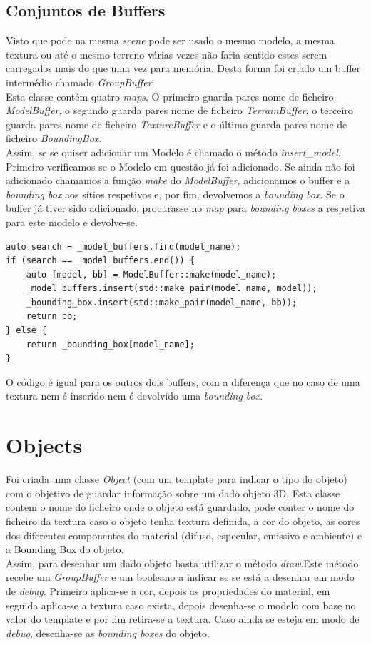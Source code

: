 \documentclass[a4paper]{report}
\begin{document}
\subsection{Conjuntos de Buffers}
Visto que pode na mesma \textit{scene} pode ser usado o mesmo modelo, a mesma
textura ou até o mesmo terreno várias vezes não faria sentido estes serem
carregados mais do que uma vez para memória. Desta forma foi criado um buffer
intermédio chamado \textit{GroupBuffer}.\\
Esta classe contém quatro \textit{maps}. O primeiro guarda pares nome de
ficheiro \textit{ModelBuffer}, o segundo guarda pares nome de ficheiro
\textit{TerrainBuffer}, o terceiro guarda pares nome de ficheiro
\textit{TextureBuffer} e o último guarda pares nome de ficheiro
\textit{BoundingBox}.\\
Assim, se se quiser adicionar um Modelo é chamado o método
\textit{insert\_model}. Primeiro verificamos se o Modelo em questão já foi
adicionado. Se ainda não foi adicionado chamamos a função \textit{make} do
\textit{ModelBuffer}, adicionamos o buffer e a \textit{bounding box} aos sítios
respetivos e, por fim, devolvemos a \textit{bounding box}. Se o buffer já tiver
sido adicionado, procurasse no \textit{map} para \textit{bounding boxes} a
respetiva para este modelo e devolve-se.
\begin{lstlisting}
auto search = _model_buffers.find(model_name);
if (search == _model_buffers.end()) {
    auto [model, bb] = ModelBuffer::make(model_name);
    _model_buffers.insert(std::make_pair(model_name, model));
    _bounding_box.insert(std::make_pair(model_name, bb));
    return bb;
} else {
    return _bounding_box[model_name];
}
\end{lstlisting}
O código é igual para os outros dois buffers, com a diferença que no caso de uma
textura nem é inserido nem é devolvido uma \textit{bounding box}.

\section{Objects}
Foi criada uma classe \textit{Object} (com um template para indicar o tipo do
objeto) com o objetivo de guardar informação sobre um dado objeto 3D. Esta
classe contem o nome do ficheiro onde o objeto está guardado, pode conter o nome
do ficheiro da textura caso o objeto tenha textura definida, a cor do objeto, as
cores dos diferentes componentes do material (difuso, especular, emissivo e
ambiente) e a Bounding Box do objeto.\\
Assim, para desenhar um dado objeto basta utilizar o método \textit{draw}.Este
método recebe um \textit{GroupBuffer} e um booleano a indicar se se está a
desenhar em modo de \textit{debug}. Primeiro aplica-se a cor, depois as
propriedades do material, em seguida aplica-se a textura caso exista, depois
desenha-se o modelo com base no valor do template e por fim retira-se a textura.
Caso ainda se esteja em modo de \textit{debug}, desenha-se as \textit{bounding
boxes} do objeto.
\end{document}
